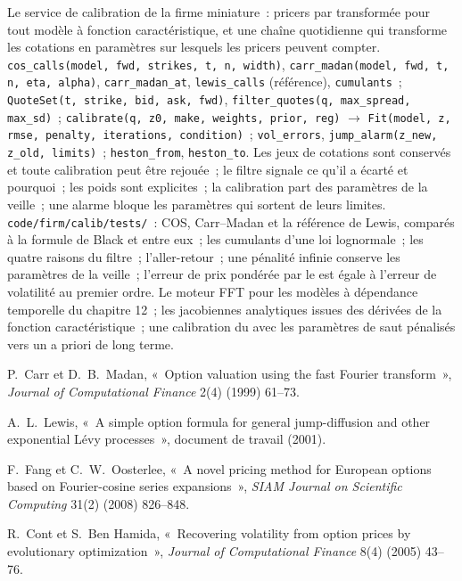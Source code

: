 \begin{build}
 Le service de calibration de la firme miniature~: pricers par transformée pour tout modèle à fonction caractéristique, et une chaîne quotidienne
qui transforme les cotations en paramètres sur lesquels les pricers peuvent compter.
 \texttt{cos\_calls(model, fwd, strikes, t, n, width)}, \texttt{carr\_madan(model, fwd, t, n, eta, alpha)},
\texttt{carr\_madan\_at}, \texttt{lewis\_calls} (référence), \texttt{cumulants}~; \texttt{QuoteSet(t, strike, bid, ask, fwd)},
\texttt{filter\_quotes(q, max\_spread, max\_sd)}~; \texttt{calibrate(q, z0, make, weights, prior, reg)} $\to$ \texttt{Fit(model, z, rmse,
penalty, iterations, condition)}~; \texttt{vol\_errors}, \texttt{jump\_alarm(z\_new, z\_old, limits)}~; \texttt{heston\_from}, \texttt{heston\_to}.
 Les jeux de cotations sont conservés et toute calibration peut être rejouée~; le filtre signale ce qu'il a écarté et pourquoi~; les poids sont explicites~;
la calibration part des paramètres de la veille~; une alarme bloque les paramètres qui sortent de leurs limites.
 \texttt{code/firm/calib/tests/}~: COS, Carr--Madan et la référence de Lewis, comparés à la formule de Black et entre eux~;
les cumulants d'une loi lognormale~; les quatre raisons du filtre~; l'aller-retour~; une pénalité infinie conserve les paramètres de la veille~; l'erreur de prix pondérée par le
 est égale à l'erreur de volatilité au premier ordre.
 Le moteur FFT pour les modèles à dépendance temporelle du chapitre 12~; les jacobiennes analytiques issues des dérivées de la fonction caractéristique~;
une calibration du  avec les paramètres de saut pénalisés vers un a priori de long terme.
\end{build}

\begin{omsources}
\item P.~Carr et D.~B.~Madan, «~Option valuation using the fast Fourier transform~», \emph{Journal of Computational Finance} 2(4) (1999) 61--73.
\item A.~L.~Lewis, «~A simple option formula for general jump-diffusion and other exponential Lévy processes~», document de travail (2001).
\item F.~Fang et C.~W.~Oosterlee, «~A novel pricing method for European options based on Fourier-cosine series expansions~», \emph{SIAM Journal on
Scientific Computing} 31(2) (2008) 826--848.
\item R.~Cont et S.~Ben Hamida, «~Recovering volatility from option prices by evolutionary optimization~», \emph{Journal of Computational Finance}
8(4) (2005) 43--76.
\end{omsources}


